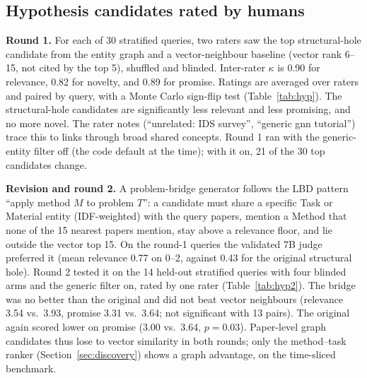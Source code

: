 \documentclass[conference]{IEEEtran}
\begin{document}
\subsection{Hypothesis candidates rated by humans}
\label{sec:hyp}

\textbf{Round 1.} For each of 30 stratified queries, two raters saw the top structural-hole candidate from the entity graph and a vector-neighbour baseline (vector rank 6--15, not cited by the top 5), shuffled and blinded. Inter-rater $\kappa$ is 0.90 for relevance, 0.82 for novelty, and 0.89 for promise. Ratings are averaged over raters and paired by query, with a Monte Carlo sign-flip test (Table~\ref{tab:hyp}). The structural-hole candidates are significantly less relevant and less promising, and no more novel. The rater notes (``unrelated: IDS survey'', ``generic gnn tutorial'') trace this to links through broad shared concepts. Round 1 ran with the generic-entity filter off (the code default at the time); with it on, 21 of the 30 top candidates change.

\begin{table}[t]
\centering
\caption{Human ratings of hypothesis candidates, round 1 (1--5, 30 queries, mean of two raters)}
\label{tab:hyp}
\end{table}

\textbf{Revision and round 2.} A problem-bridge generator follows the LBD pattern ``apply method $M$ to problem $T$'': a candidate must share a specific Task or Material entity (IDF-weighted) with the query papers, mention a Method that none of the 15 nearest papers mention, stay above a relevance floor, and lie outside the vector top 15. On the round-1 queries the validated 7B judge preferred it (mean relevance 0.77 on 0--2, against 0.43 for the original structural hole). Round 2 tested it on the 14 held-out stratified queries with four blinded arms and the generic filter on, rated by one rater (Table~\ref{tab:hyp2}). The bridge was no better than the original and did not beat vector neighbours (relevance 3.54 vs.\ 3.93, promise 3.31 vs.\ 3.64; not significant with 13 pairs). The original again scored lower on promise (3.00 vs.\ 3.64, $p = 0.03$). Paper-level graph candidates thus lose to vector similarity in both rounds; only the method--task ranker (Section~\ref{sec:discovery}) shows a graph advantage, on the time-sliced benchmark.
\end{document}
